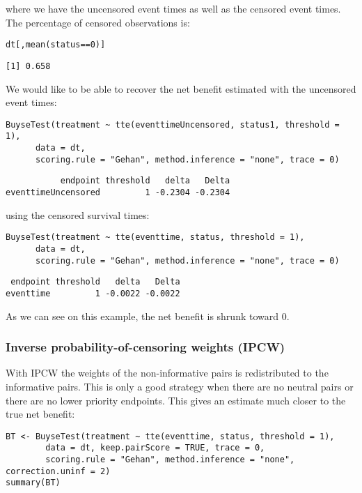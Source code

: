 \documentclass[12pt]{article}
\begin{document}
where we have the uncensored event times as well as the censored event
times. The percentage of censored observations is:
\lstset{language=r,label= ,caption= ,captionpos=b,numbers=none}
\begin{lstlisting}
dt[,mean(status==0)]
\end{lstlisting}

\begin{verbatim}
[1] 0.658
\end{verbatim}

We would like to be able to recover the net benefit estimated with the uncensored event times:
\lstset{language=r,label= ,caption= ,captionpos=b,numbers=none}
\begin{lstlisting}
BuyseTest(treatment ~ tte(eventtimeUncensored, status1, threshold = 1),
	  data = dt,
	  scoring.rule = "Gehan", method.inference = "none", trace = 0)
\end{lstlisting}

\begin{verbatim}
           endpoint threshold   delta   Delta
eventtimeUncensored         1 -0.2304 -0.2304
\end{verbatim}

using the censored survival times:
\lstset{language=r,label= ,caption= ,captionpos=b,numbers=none}
\begin{lstlisting}
BuyseTest(treatment ~ tte(eventtime, status, threshold = 1),
	  data = dt,
	  scoring.rule = "Gehan", method.inference = "none", trace = 0)
\end{lstlisting}

\begin{verbatim}
 endpoint threshold   delta   Delta
eventtime         1 -0.0022 -0.0022
\end{verbatim}

As we can see on this example, the net benefit is shrunk toward 0.

\subsubsection{Inverse probability-of-censoring weights (IPCW)}
\label{sec:org48c8a28}

With IPCW the weights of the non-informative pairs is redistributed to
the informative pairs. This is only a good strategy when there are no
neutral pairs or there are no lower priority endpoints. This gives an
estimate much closer to the true net benefit:
\lstset{language=r,label= ,caption= ,captionpos=b,numbers=none}
\begin{lstlisting}
BT <- BuyseTest(treatment ~ tte(eventtime, status, threshold = 1),
		data = dt, keep.pairScore = TRUE, trace = 0,
		scoring.rule = "Gehan", method.inference = "none", correction.uninf = 2)
summary(BT)
\end{lstlisting}
\end{document}
